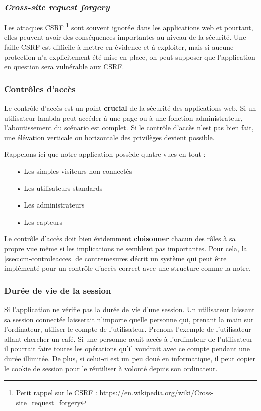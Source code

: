 \subsubsection{\emph{Cross-site request forgery}}

Les attaques CSRF \footnote{Petit rappel sur le CSRF : \url{https://en.wikipedia.org/wiki/Cross-site_request_forgery}} sont souvent ignorée dans les applications web et pourtant, elles peuvent avoir des conséquences importantes au niveau de la sécurité. Une faille CSRF est difficile à
mettre en évidence et à exploiter, mais si aucune protection n'a explicitement été mise en place, on peut supposer que l'application en question sera vulnérable aux CSRF.

\subsubsection{Contrôles d'accès}

Le contrôle d'accès est un point \textbf{crucial} de la sécurité des applications web. Si un utilisateur lambda peut accéder à une page ou à une fonction administrateur, l'aboutissement du scénario est complet. Si le contrôle d'accès n'est pas bien fait, une élévation verticale ou horizontale des privilèges devient possible.

Rappelons ici que notre application possède quatre vues en tout :

\begin{itemize}
\item[•] Les simples visiteurs non-connectés
\item[•] Les utilisateurs standards
\item[•] Les administrateurs
\item[•] Les capteurs
\end{itemize}

Le contrôle d'accès doit bien évidemment \textbf{cloisonner} chacun des rôles à sa propre vue même si les implications ne semblent pas importantes. Pour cela, la \autoref{ssec:cm-controleacces} de contremesures décrit un système qui peut être implémenté pour un contrôle d'accès correct avec une structure comme la notre.

\subsubsection{Durée de vie de la session}

Si l'application ne vérifie pas la durée de vie d'une session. Un utilisateur laissant sa session connectée  laisserait n'importe quelle personne qui, prenant la main sur l'ordinateur, utiliser le compte de l'utilisateur.
Prenons l'exemple de l'utilisateur allant chercher un café. Si une personne avait accès à l'ordinateur de l'utilisateur il pourrait faire toutes les opérations qu'il voudrait avec ce compte pendant une durée illimitée. De plus, si celui-ci est un peu doué en informatique, il peut copier le cookie de session pour le réutiliser à volonté depuis son ordinateur.

